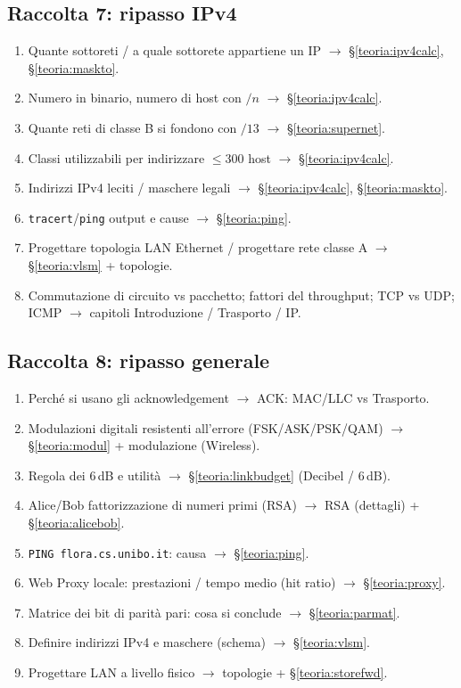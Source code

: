 \documentclass[11pt,a4paper]{report}
\begin{document}
\subsection*{Raccolta 7: ripasso IPv4}
\begin{enumerate}[noitemsep]
\item Quante sottoreti / a quale sottorete appartiene un IP $\to$ \S\ref{teoria:ipv4calc}, \S\ref{teoria:maskto}.
\item Numero in binario, numero di host con $/n$ $\to$ \S\ref{teoria:ipv4calc}.
\item Quante reti di classe B si fondono con $/13$ $\to$ \S\ref{teoria:supernet}.
\item Classi utilizzabili per indirizzare $\le 300$ host $\to$ \S\ref{teoria:ipv4calc}.
\item Indirizzi IPv4 leciti / maschere legali $\to$ \S\ref{teoria:ipv4calc}, \S\ref{teoria:maskto}.
\item \texttt{tracert}/\texttt{ping} output e cause $\to$ \S\ref{teoria:ping}.
\item Progettare topologia LAN Ethernet / progettare rete classe A $\to$ \S\ref{teoria:vlsm} + topologie.
\item Commutazione di circuito vs pacchetto; fattori del throughput; TCP vs UDP; ICMP $\to$ capitoli Introduzione / Trasporto / IP.
\end{enumerate}

\subsection*{Raccolta 8: ripasso generale}
\begin{enumerate}[noitemsep]
\item Perché si usano gli acknowledgement $\to$ ACK: MAC/LLC vs Trasporto.
\item Modulazioni digitali resistenti all'errore (FSK/ASK/PSK/QAM) $\to$ \S\ref{teoria:modul} + modulazione (Wireless).
\item Regola dei 6\,dB e utilità $\to$ \S\ref{teoria:linkbudget} (Decibel / 6\,dB).
\item Alice/Bob fattorizzazione di numeri primi (RSA) $\to$ RSA (dettagli) + \S\ref{teoria:alicebob}.
\item \texttt{PING flora.cs.unibo.it}: causa $\to$ \S\ref{teoria:ping}.
\item Web Proxy locale: prestazioni / tempo medio (hit ratio) $\to$ \S\ref{teoria:proxy}.
\item Matrice dei bit di parità pari: cosa si conclude $\to$ \S\ref{teoria:parmat}.
\item Definire indirizzi IPv4 e maschere (schema) $\to$ \S\ref{teoria:vlsm}.
\item Progettare LAN a livello fisico $\to$ topologie + \S\ref{teoria:storefwd}.
\end{enumerate}
\end{document}
